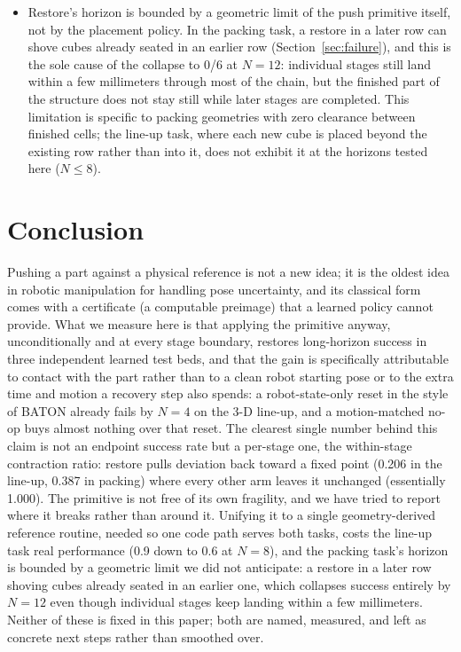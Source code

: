 \documentclass[11pt]{article}
\begin{document}
\begin{itemize}
  \item Restore's horizon is bounded by a geometric limit of the push
  primitive itself, not by the placement policy. In the packing task, a
  restore in a later row can shove cubes already seated in an earlier row
  (Section~\ref{sec:failure}), and this is the sole cause of the collapse
  to 0/6 at $N=12$: individual stages still land within a few millimeters
  through most of the chain, but the finished part of the structure does
  not stay still while later stages are completed. This limitation is
  specific to packing geometries with zero clearance between finished
  cells; the line-up task, where each new cube is placed beyond the
  existing row rather than into it, does not exhibit it at the horizons
  tested here ($N \leq 8$).
\end{itemize}

\section{Conclusion}

Pushing a part against a physical reference is not a new idea; it is the
oldest idea in robotic manipulation for handling pose uncertainty, and its
classical form comes with a certificate (a computable preimage) that a
learned policy cannot provide. What we measure here is that applying the
primitive anyway, unconditionally and at every stage boundary, restores
long-horizon success in three independent learned test beds, and that the
gain is specifically attributable to contact with the part rather than to
a clean robot starting pose or to the extra time and motion a recovery step
also spends: a robot-state-only reset in the style of BATON already fails
by $N=4$ on the 3-D line-up, and a motion-matched no-op buys almost nothing
over that reset. The clearest single number behind this claim is not an
endpoint success rate but a per-stage one, the within-stage contraction
ratio: restore pulls deviation back toward a fixed point (0.206 in the
line-up, 0.387 in packing) where every other arm leaves it unchanged
(essentially 1.000). The primitive is not free of its own fragility, and we
have tried to report where it breaks rather than around it. Unifying it to
a single geometry-derived reference routine, needed so one code path serves
both tasks, costs the line-up task real performance (0.9 down to 0.6 at
$N=8$), and the packing task's horizon is bounded by a geometric limit we
did not anticipate: a restore in a later row shoving cubes already seated
in an earlier one, which collapses success entirely by $N=12$ even though
individual stages keep landing within a few millimeters. Neither of these
is fixed in this paper; both are named, measured, and left as concrete
next steps rather than smoothed over.
\end{document}
